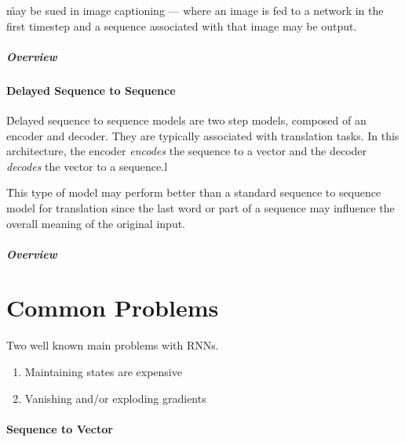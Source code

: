 \r{may be sued in image captioning --- where an image is fed to a network in the first timestep and a sequence associated with that image may be output.}

\subparagraph{Overview}


\paragraph{Delayed Sequence to Sequence}

\r{Delayed sequence to sequence models are two step models, composed of an encoder and decoder. They are typically associated with translation tasks.  In this architecture, the encoder \textit{encodes} the sequence to a vector and the decoder \textit{decodes} the vector to a sequence.}l

\r{This type of model may perform better than a standard sequence to sequence model for translation since the last word or part of a sequence may influence the overall meaning of the original input.}

\subparagraph{Overview}



\section{Common Problems}

Two well known main problems with RNNs.

\begin{enumerate}[noitemsep,topsep=0pt]
	\item Maintaining states are expensive
	\item Vanishing and/or exploding gradients
\end{enumerate}

\paragraph{Sequence to Vector}